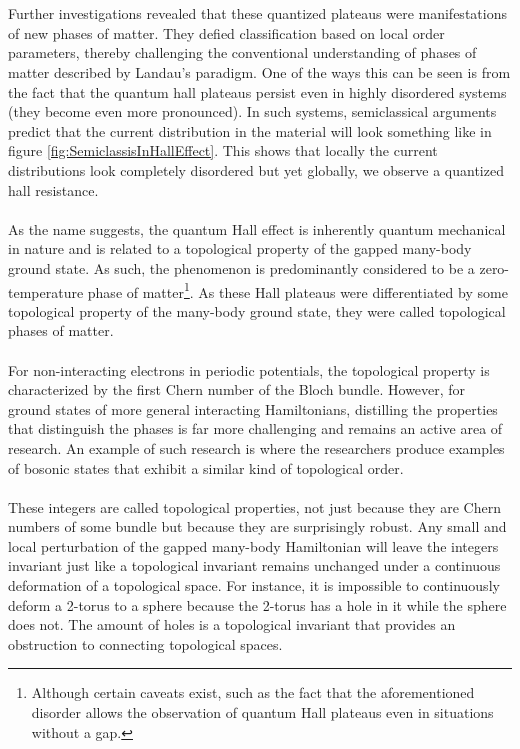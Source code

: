 \\\\
Further investigations revealed that these quantized plateaus were manifestations of new phases of matter. They defied classification based on local order parameters, thereby challenging the conventional understanding of phases of matter described by Landau's paradigm. One of the ways this can be seen is from the fact that the quantum hall plateaus persist even in highly disordered systems (they become even more pronounced). In such systems, semiclassical arguments predict that the current distribution in the material will look something like in figure \ref{fig:SemiclassisInHallEffect}. This shows that locally the current distributions look completely disordered but yet globally, we observe a quantized hall resistance.
\\\\
As the name suggests, the quantum Hall effect is inherently quantum mechanical in nature and is related to a topological property of the gapped many-body ground state. As such, the phenomenon is predominantly considered to be a zero-temperature phase of matter\footnote{Although certain caveats exist, such as the fact that the aforementioned disorder allows the observation of quantum Hall plateaus even in situations without a gap.}. As these Hall plateaus were differentiated by some topological property of the many-body ground state, they were called topological phases of matter.
\\\\
For non-interacting electrons in periodic potentials, the topological property is characterized by the first Chern number of the Bloch bundle. However, for ground states of more general interacting Hamiltonians, distilling the properties that distinguish the phases is far more challenging and remains an active area of research. An example of such research is \cite{sopenko2023chiral} where the researchers produce examples of bosonic states that exhibit a similar kind of topological order.
\\\\
These integers are called topological properties, not just because they are Chern numbers of some bundle but because they are surprisingly robust. Any small and local perturbation of the gapped many-body Hamiltonian will leave the integers invariant just like a topological invariant remains unchanged under a continuous deformation of a topological space. For instance, it is impossible to continuously deform a 2-torus to a sphere because the 2-torus has a hole in it while the sphere does not. The amount of holes is a topological invariant that provides an obstruction to connecting topological spaces.

